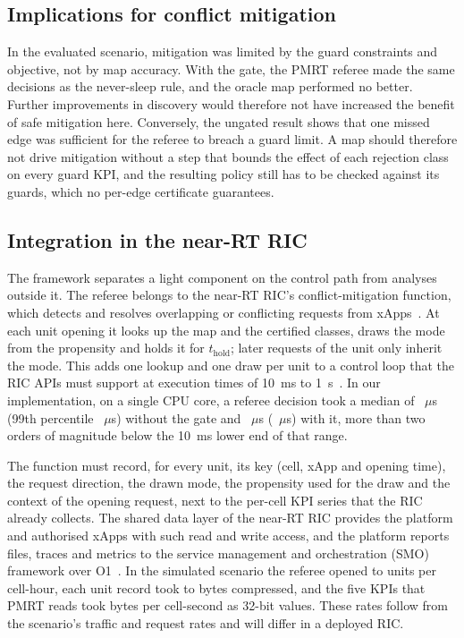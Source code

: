 \subsection{Implications for conflict mitigation}
\label{sec:disc_mitigation}

In the evaluated scenario, mitigation was limited by the guard constraints and objective, not by map accuracy. With
the gate, the PMRT referee made the same decisions as the never-sleep rule, and the oracle map performed no better.
Further improvements in discovery would therefore not have increased the benefit of safe mitigation here. Conversely,
the ungated result shows that one missed edge was sufficient for the referee to breach a guard limit. A map should therefore not drive
mitigation without a step that bounds the effect of each rejection class on every guard KPI, and the resulting policy
still has to be checked against its guards, which no per-edge certificate guarantees.

\subsection{Integration in the near-RT RIC}
\label{sec:disc_integration}

The framework separates a light component on the control path from analyses outside it. The referee belongs to the
near-RT RIC's conflict-mitigation function, which detects and resolves overlapping or conflicting requests from
xApps~\cite{ORANRICARCH}. At each unit opening it looks up the map and the certified classes, draws the mode from the
propensity and holds it for $t_{\mathrm{hold}}$; later requests of the unit only inherit the mode. This adds one lookup
and one draw per unit to a control loop that the RIC APIs must support at execution times of 10~ms to
1~s~\cite{ORANRICARCH}. In our implementation, on a single CPU core, a referee decision took a median of
~$\mu$s (99th percentile ~$\mu$s) without the gate and ~$\mu$s
(~$\mu$s) with it, more than two orders of magnitude below the 10~ms lower end of that range.

The function must record, for every unit, its key (cell, xApp and opening time), the request direction, the drawn mode,
the propensity used for the draw and the context of the opening request, next to the per-cell KPI series that the RIC
already collects. The shared data layer of the near-RT RIC provides the platform and authorised xApps with such read and
write access, and the platform reports files, traces and metrics to the service management and orchestration (SMO)
framework over O1~\cite{ORANRICARCH}. In the simulated scenario the referee opened  to
 units per cell-hour, each unit record took  to  bytes
compressed, and the five KPIs that PMRT reads took  bytes per cell-second as 32-bit values. These
rates follow from the scenario's traffic and request rates and will differ in a deployed RIC.

